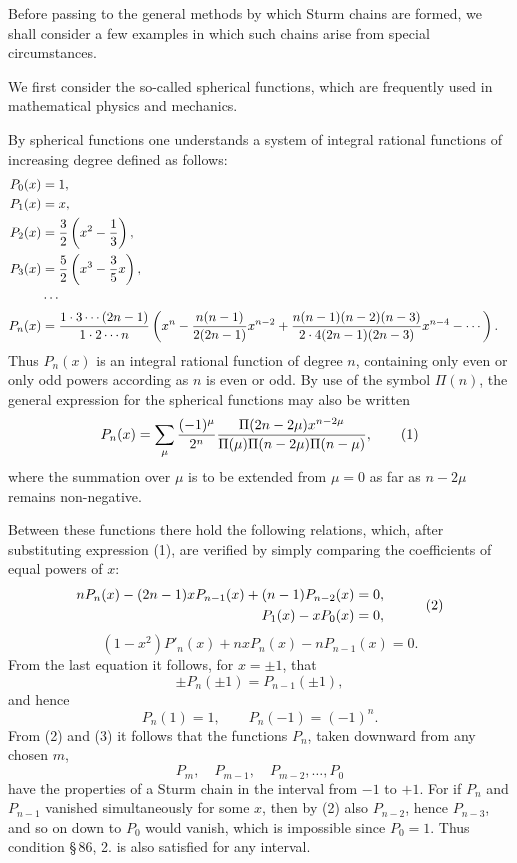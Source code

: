 \documentclass[11pt]{article}
\begin{document}
Before passing to the general methods by which Sturm chains are formed, we shall consider a few examples in which such chains arise from special circumstances.

We first consider the so-called spherical functions, which are frequently used in mathematical physics and mechanics.

By spherical functions one understands a system of integral rational functions of increasing degree defined as follows:
\[
\begin{aligned}
        P_0(x)&=1,\cr
        P_1(x)&=x,\cr
        P_2(x)&={3\over2}\left(x^2-{1\over3}\right),\cr
        P_3(x)&={5\over2}\left(x^3-{3\over5}x\right),\cr
        &\cdots\cr
        P_n(x)&={1\cdot3\cdots(2n-1)\over1\cdot2\cdots n}
        \left(x^n-{n(n-1)\over2(2n-1)}x^{n-2}
        +{n(n-1)(n-2)(n-3)\over2\cdot4(2n-1)(2n-3)}x^{n-4}-\cdots\right).
\end{aligned}
\]
Thus $P_n(x)$ is an integral rational function of degree $n$, containing only even or only odd powers according as $n$ is even or odd. By use of the symbol $\Pi(n)$, the general expression for the spherical functions may also be written
\begin{equation}
        P_n(x)=\sum_\mu {(-1)^\mu\over 2^n}
        {\Pi(2n-2\mu)x^{n-2\mu}\over \Pi(\mu)\Pi(n-2\mu)\Pi(n-\mu)},
\tag{1}
\end{equation}
where the summation over $\mu$ is to be extended from $\mu=0$ as far as $n-2\mu$ remains non-negative.

Between these functions there hold the following relations, which, after substituting expression (1), are verified by simply comparing the coefficients of equal powers of $x$:
\begin{equation}
\begin{aligned}
        nP_n(x)-(2n-1)xP_{n-1}(x)+(n-1)P_{n-2}(x)&=0,\cr
        P_1(x)-xP_0(x)&=0,
\end{aligned}
\tag{2}
\end{equation}
\begin{equation}
        (1-x^2)P'_n(x)+nxP_n(x)-nP_{n-1}(x)=0.
\tag{3}
\end{equation}
From the last equation it follows, for $x=\pm1$, that
\[
        \pm P_n(\pm1)=P_{n-1}(\pm1),
\]
and hence
\begin{equation}
        P_n(1)=1,
        \qquad P_n(-1)=(-1)^n.
\tag{4}
\end{equation}
From (2) and (3) it follows that the functions $P_n$, taken downward from any chosen $m$,
\begin{equation}
        P_m,
        \quad P_{m-1},
        \quad P_{m-2},
        \ldots,
        P_0
\tag{5}
\end{equation}
have the properties of a Sturm chain in the interval from $-1$ to $+1$. For if $P_n$ and $P_{n-1}$ vanished simultaneously for some $x$, then by (2) also $P_{n-2}$, hence $P_{n-3}$, and so on down to $P_0$ would vanish, which is impossible since $P_0=1$. Thus condition \S\,86, 2. is also satisfied for any interval.
\end{document}
